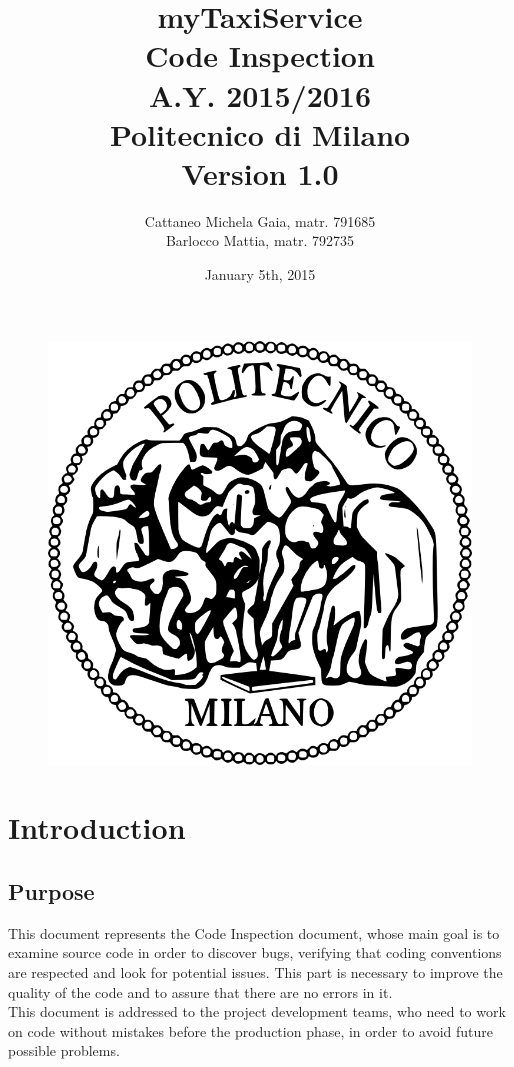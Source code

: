 \documentclass[18pt,oneside,a4paper, titlepage]{article}
\begin{document}
\begin{figure}[t]
	\centering
	\includegraphics[scale=0.35]{logo-polimi.png}
\end{figure}
\title{\textbf{myTaxiService}\\Code Inspection\\ A.Y. 2015/2016\\
	Politecnico di Milano\\ Version 1.0}	
\author{Cattaneo Michela Gaia, matr. 791685\\Barlocco Mattia, matr. 792735 }
\date{January 5th, 2015}
\maketitle

\newpage
\tableofcontents

\newpage
\section{Introduction}
	\subsection{Purpose}
		This document represents the Code Inspection document, whose main goal is to examine source code in order to discover bugs, verifying that coding conventions are respected and look for potential issues. This part is necessary to improve the quality of the code and to assure that there are no errors in it. \\
		This document is addressed to the project development teams, who need to work on code without mistakes before the production phase, in order to avoid future possible problems.
\end{document}
